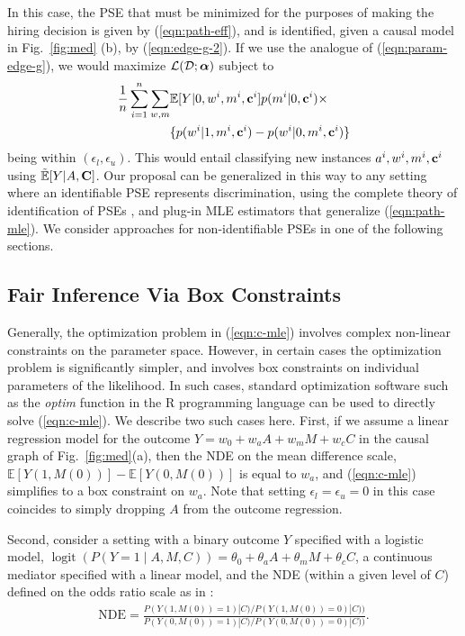 \documentclass[letterpaper]{article} %
\newcommand{\citep}{\cite}
\begin{document}
In this case, the PSE that must be minimized for the purposes of making the hiring decision is given by (\ref{eqn:path-eff}), and is identified, given a causal model in Fig.~\ref{fig:med} (b), by (\ref{eqn:edge-g-2}).  If we use the analogue of (\ref{eqn:param-edge-g}), we would maximize
${\cal L}({\cal D}
; {\bm\alpha})$ subject to
{\small
\begin{align}
\notag
\frac{1}{n} \sum_{i=1}^n \sum_{w,m} &
\mathbb{E}[Y | 0,w^i,m^i,{\bf c}^i%
] p(m^i | 0, {\bf c}^i%
) \times \\
&
 \{ p(w^i | 1, m^i, {\bf c}^i%
)-p(w^i | 0, m^i, {\bf c}^i%
) \}
\label{eqn:path-mle}
\end{align}
}
being within $(\epsilon_l, \epsilon_u)$.  This would entail classifying new instances $a^i,w^i,m^i,{\bf c}^i$
using $\tilde{\mathbb{E}}[Y | A,{\bf C}%
]$.  Our proposal can be generalized in this way to any setting where an identifiable PSE represents discrimination, using the complete theory of identification of PSEs \citep{shpitser13cogsci}, and plug-in MLE estimators that generalize (\ref{eqn:path-mle}).  We consider approaches for non-identifiable PSEs in one of the following sections.

\subsection{Fair Inference Via Box Constraints}
\label{subsec:box}

Generally, the optimization problem in (\ref{eqn:c-mle}) involves complex non-linear constraints on the parameter space.  However, in certain cases the optimization problem is significantly simpler, and involves box constraints on individual parameters of the likelihood.  In such cases, standard optimization software such as the \textit{optim} function in the R programming language can be used to directly solve (\ref{eqn:c-mle}).  We describe two such cases here.
First, if we assume a linear regression model for the outcome $Y = w_0 + w_a A + w_m M + w_c C$ in the causal graph of Fig.~\ref{fig:med}(a), then the
NDE on the mean difference scale, $\mathbb{E}[Y(1,M(0))] - \mathbb{E}[Y(0,M(0))]$ is equal to $w_a$, and (\ref{eqn:c-mle}) simplifies to a box constraint on $w_a$.  Note that setting $\epsilon_l = \epsilon_u = 0$ in this case coincides to simply dropping $A$ from the outcome regression.

Second, consider a setting with a binary outcome $Y$ specified with a logistic model, $\operatorname{logit}(P(Y = 1 \mid A, M, C)) = \theta_0 + \theta_aA + \theta_mM + \theta_cC $, a continuous mediator specified with a linear model, and the NDE (within a given level of $C$) defined on the odds ratio scale as in \citep{tyler10odds}:
{\small
\begin{align*}
\text{NDE} = \frac{ P(Y(1,M(0)) = 1)| C) / P(Y(1,M(0)) = 0)| C))}{P(Y(0,M(0)) = 1)| C) / P(Y(0,M(0)) = 0) | C))}. \nonumber %
\end{align*}
}
\end{document}
